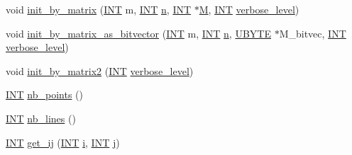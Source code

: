 \begin{DoxyCompactItemize}
\item 
void \mbox{\hyperlink{classincidence__structure_a3f4fea622872e3e0f50698abca967561}{init\+\_\+by\+\_\+matrix}} (\mbox{\hyperlink{galois_8h_a09fddde158a3a20bd2dcadb609de11dc}{I\+NT}} m, \mbox{\hyperlink{galois_8h_a09fddde158a3a20bd2dcadb609de11dc}{I\+NT}} \mbox{\hyperlink{simeon_8_c_a7f2cd26777ce0ff3fdaf8d02aacbddfb}{n}}, \mbox{\hyperlink{galois_8h_a09fddde158a3a20bd2dcadb609de11dc}{I\+NT}} $\ast$\mbox{\hyperlink{classincidence__structure_a24b84578c7991e2cfed88cd96b619a0d}{M}}, \mbox{\hyperlink{galois_8h_a09fddde158a3a20bd2dcadb609de11dc}{I\+NT}} \mbox{\hyperlink{simeon_8_c_a818073fbcc2f439e7c56952f67386122}{verbose\+\_\+level}})
\item 
void \mbox{\hyperlink{classincidence__structure_a000a010bd2cc84ad09bd60aab5cabdb0}{init\+\_\+by\+\_\+matrix\+\_\+as\+\_\+bitvector}} (\mbox{\hyperlink{galois_8h_a09fddde158a3a20bd2dcadb609de11dc}{I\+NT}} m, \mbox{\hyperlink{galois_8h_a09fddde158a3a20bd2dcadb609de11dc}{I\+NT}} \mbox{\hyperlink{simeon_8_c_a7f2cd26777ce0ff3fdaf8d02aacbddfb}{n}}, \mbox{\hyperlink{galois_8h_a122c4acf389c050379f00341fdcd5812}{U\+B\+Y\+TE}} $\ast$M\+\_\+bitvec, \mbox{\hyperlink{galois_8h_a09fddde158a3a20bd2dcadb609de11dc}{I\+NT}} \mbox{\hyperlink{simeon_8_c_a818073fbcc2f439e7c56952f67386122}{verbose\+\_\+level}})
\item 
void \mbox{\hyperlink{classincidence__structure_ad482ea9654ee04fc92082698bd777aca}{init\+\_\+by\+\_\+matrix2}} (\mbox{\hyperlink{galois_8h_a09fddde158a3a20bd2dcadb609de11dc}{I\+NT}} \mbox{\hyperlink{simeon_8_c_a818073fbcc2f439e7c56952f67386122}{verbose\+\_\+level}})
\item 
\mbox{\hyperlink{galois_8h_a09fddde158a3a20bd2dcadb609de11dc}{I\+NT}} \mbox{\hyperlink{classincidence__structure_aff5f6bfdc7470e73082ee6faacf0af64}{nb\+\_\+points}} ()
\item 
\mbox{\hyperlink{galois_8h_a09fddde158a3a20bd2dcadb609de11dc}{I\+NT}} \mbox{\hyperlink{classincidence__structure_a9ffac61340b2a03f31f1cc366d5a7b79}{nb\+\_\+lines}} ()
\item 
\mbox{\hyperlink{galois_8h_a09fddde158a3a20bd2dcadb609de11dc}{I\+NT}} \mbox{\hyperlink{classincidence__structure_a5ee9b327bdd0c2714cadff040a4c4678}{get\+\_\+ij}} (\mbox{\hyperlink{galois_8h_a09fddde158a3a20bd2dcadb609de11dc}{I\+NT}} \mbox{\hyperlink{alphabet2_8_c_acb559820d9ca11295b4500f179ef6392}{i}}, \mbox{\hyperlink{galois_8h_a09fddde158a3a20bd2dcadb609de11dc}{I\+NT}} \mbox{\hyperlink{alphabet2_8_c_a37d972ae0b47b9099e30983131d31916}{j}})
\item 

\end{DoxyCompactItemize}
